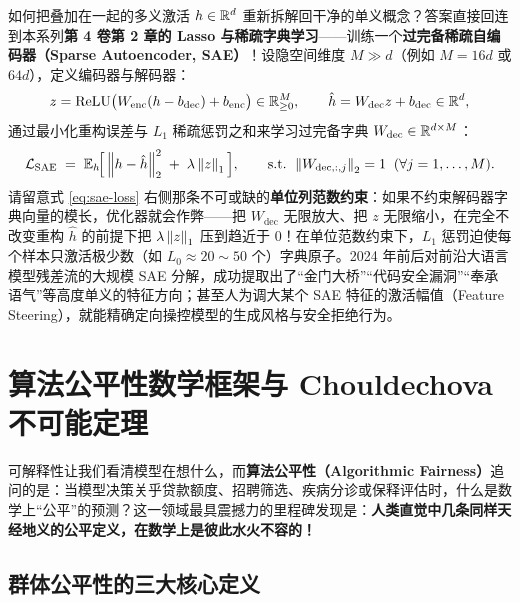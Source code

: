 如何把叠加在一起的多义激活 $h \in \mathbb{R}^d$ 重新拆解回干净的单义概念？答案直接回连到本系列\textbf{第 4 卷第 2 章的 Lasso 与稀疏字典学习}——训练一个\textbf{过完备稀疏自编码器（Sparse Autoencoder, SAE）}！设隐空间维度 $M \gg d$（例如 $M = 16 d$ 或 $64 d$），定义编码器与解码器：
\begin{equation}\label{eq:sae}
  z = \operatorname{ReLU}\!\big(W_{\text{enc}}(h - b_{\text{dec}}) + b_{\text{enc}}\big) \in \mathbb{R}_{\ge 0}^M,
  \qquad
  \hat{h} = W_{\text{dec}} z + b_{\text{dec}} \in \mathbb{R}^d,
\end{equation}
通过最小化重构误差与 $L_1$ 稀疏惩罚之和来学习过完备字典 $W_{\text{dec}} \in \mathbb{R}^{d \times M}$：
\begin{equation}\label{eq:sae-loss}
  \mathcal{L}_{\text{SAE}} \;=\; \mathbb{E}_{h}\!\Big[\left\|h - \hat{h}\right\|_2^2 \;+\; \lambda \left\|z\right\|_1\Big],
  \qquad \text{s.t. } \left\|W_{\text{dec}, :, j}\right\|_2 = 1 \;\; (\forall j = 1,\dots,M).
\end{equation}
请留意式 \eqref{eq:sae-loss} 右侧那条不可或缺的\textbf{单位列范数约束}：如果不约束解码器字典向量的模长，优化器就会作弊——把 $W_{\text{dec}}$ 无限放大、把 $z$ 无限缩小，在完全不改变重构 $\hat{h}$ 的前提下把 $\lambda\left\|z\right\|_1$ 压到趋近于 $0$！在单位范数约束下，$L_1$ 惩罚迫使每个样本只激活极少数（如 $L_0 \approx 20 \sim 50$ 个）字典原子。2024 年前后对前沿大语言模型残差流的大规模 SAE 分解，成功提取出了“金门大桥”“代码安全漏洞”“奉承语气”等高度单义的特征方向；甚至人为调大某个 SAE 特征的激活幅值（Feature Steering），就能精确定向操控模型的生成风格与安全拒绝行为。

\section{算法公平性数学框架与 Chouldechova 不可能定理}

可解释性让我们看清模型在想什么，而\textbf{算法公平性（Algorithmic Fairness）}追问的是：当模型决策关乎贷款额度、招聘筛选、疾病分诊或保释评估时，什么是数学上“公平”的预测？这一领域最具震撼力的里程碑发现是：\textbf{人类直觉中几条同样天经地义的公平定义，在数学上是彼此水火不容的！}

\subsection{群体公平性的三大核心定义}


